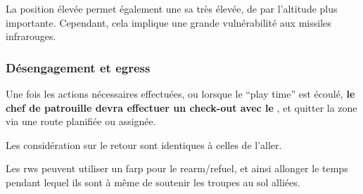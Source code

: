 	    \item
	    La position élevée permet également une \gls{sa} très élevée, de par l'altitude plus importante. Cependant, cela implique une grande vulnérabilité aux missiles infrarouges.
	\ed
\ed

\subsubsection{Désengagement et egress}

\e
    \item
    Une fois les actions nécessaires effectuées, ou lorsque le ``play time'' est écoulé, \textbf{le chef de patrouille devra effectuer un check-out avec le \ja{}}, et quitter la zone via une route planifiée ou assignée.
    \item Les considération sur le retour sont identiques à celles de l'aller.
    \item Les \gls{rw}s peuvent utiliser un \gls{farp} pour le rearm/refuel, et ainsi allonger le temps pendant lequel ils sont à même de soutenir les troupes au sol alliées.

    \item {}

\ed

